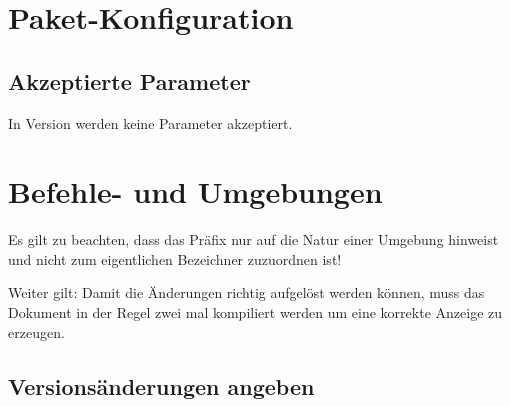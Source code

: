 \documentclass{sopra-base}
\begin{document}
\section{Paket-Konfiguration}
    \subsection{Akzeptierte Parameter}
    In Version \thesocversion{} werden keine Parameter akzeptiert.

%
%
%
%

\section{Befehle- und Umgebungen}

Es gilt zu beachten, dass das Präfix  nur auf die Natur einer Umgebung hinweist und nicht zum eigentlichen Bezeichner zuzuordnen ist!\par{}
Weiter gilt: Damit die Änderungen richtig aufgelöst werden können, muss das Dokument
in der Regel zwei mal kompiliert werden um eine korrekte Anzeige zu erzeugen.

\subsection{Versionsänderungen angeben}
\end{document}

